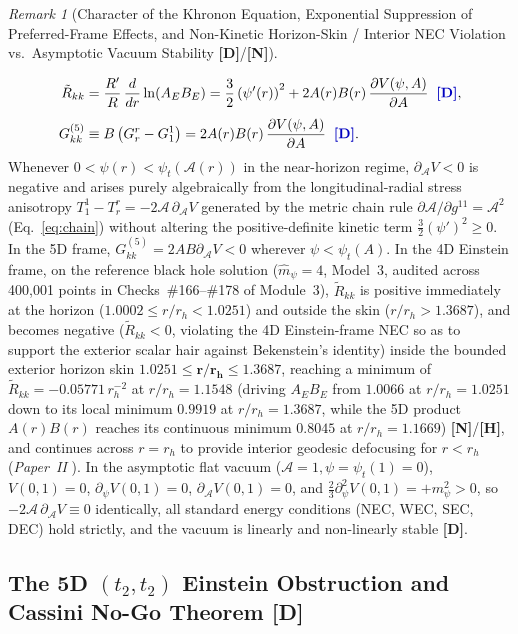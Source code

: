 \documentclass[11pt,a4paper]{article}
\newcommand{\catD}{\textbf{\textcolor{blue!75!black}{[D]}}}
\newcommand{\catH}{\textbf{\textcolor{orange!85!black}{[H]}}}
\newcommand{\catN}{\textbf{\textcolor{teal!75!black}{[N]}}}
\theoremstyle{definition}
\theoremstyle{remark}
\newtheorem{remark}[theorem]{Remark}
\begin{document}
\begin{remark}[Character of the Khronon Equation, Exponential Suppression of Preferred-Frame Effects, and Non-Kinetic Horizon-Skin / Interior NEC Violation vs.\ Asymptotic Vacuum Stability \catD/\catN]
\begin{enumerate}
  \begin{align}
    \tilde{R}_{kk} &= \frac{R'}{R}\,\frac{d}{dr}\ln(A_E B_E) = \frac{3}{2}\left(\psi'(r)\right)^2 + 2 A(r)B(r)\,\frac{\partial V(\psi,A)}{\partial A} \;\;\catD, \nonumber \\[4pt]
    G^{(5)}_{kk} &\equiv B\left(G^r_r - G^1_1\right) = 2 A(r)B(r)\,\frac{\partial V(\psi,A)}{\partial A} \;\;\catD.
    \label{eq:null_contractions_einstein_5d}
  \end{align}
  Whenever $0 < \psi(r) < \psi_t(\mathcal{A}(r))$ in the near-horizon regime, $\partial_{\mathcal{A}}V < 0$ is negative and arises purely algebraically from the longitudinal-radial stress anisotropy $T^1_1 - T^r_r = -2\mathcal{A}\,\partial_{\mathcal{A}}V$ generated by the metric chain rule $\partial\mathcal{A}/\partial g^{11} = \mathcal{A}^2$ (Eq.~\ref{eq:chain}) without altering the positive-definite kinetic term $\frac{3}{2}(\psi')^2 \ge 0$. In the 5D frame, $G^{(5)}_{kk} = 2AB\partial_{\mathcal{A}}V < 0$ wherever $\psi < \psi_t(A)$. In the 4D Einstein frame, on the reference black hole solution ($\hat{m}_\psi = 4$, Model~3, audited across 400{,}001 points in Checks~\#166--\#178 of Module~3), $\tilde{R}_{kk}$ is positive immediately at the horizon ($1.0002 \le r/r_h < 1.0251$) and outside the skin ($r/r_h > 1.3687$), and becomes negative ($\tilde{R}_{kk} < 0$, violating the 4D Einstein-frame NEC so as to support the exterior scalar hair against Bekenstein's identity) inside the bounded exterior horizon skin $\mathbf{1.0251 \le r/r_h \le 1.3687}$, reaching a minimum of $\tilde{R}_{kk} = -0.05771\,r_h^{-2}$ at $r/r_h = 1.1548$ (driving $A_E B_E$ from $1.0066$ at $r/r_h = 1.0251$ down to its local minimum $0.9919$ at $r/r_h = 1.3687$, while the 5D product $A(r)B(r)$ reaches its continuous minimum $0.8045$ at $r/r_h = 1.1669$) \catN/\catH, and continues across $r = r_h$ to provide interior geodesic defocusing for $r < r_h$ (\textit{Paper~II} \cite{JV_Paper2}). In the asymptotic flat vacuum ($\mathcal{A} = 1, \psi = \psi_t(1) = 0$), $V(0,1) = 0$, $\partial_{\psi}V(0,1) = 0$, $\partial_{\mathcal{A}}V(0,1) = 0$, and $\frac{2}{3}\partial_{\psi}^2 V(0,1) = +m_{\psi}^2 > 0$, so $-2\mathcal{A}\,\partial_{\mathcal{A}}V \equiv 0$ identically, all standard energy conditions (NEC, WEC, SEC, DEC) hold strictly, and the vacuum is linearly and non-linearly stable \catD.
\end{enumerate}
\end{remark}

\subsection{\texorpdfstring{The 5D $(t_2, t_2)$ Einstein Obstruction and Cassini No-Go Theorem \catD}{The 5D (t2, t2) Einstein Obstruction and Cassini No-Go Theorem}}
\end{document}
